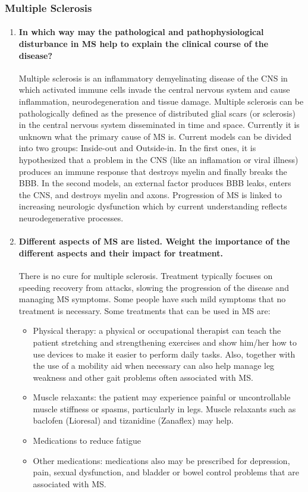 \documentclass[12pt,article,oneside,a4paper]{memoir}
\begin{document}
\subsubsection{Multiple Sclerosis}
\begin{enumerate}
\item \paragraph{In which way may the pathological and pathophysiological disturbance in MS help to explain the clinical course of the disease?}

Multiple sclerosis is an inflammatory demyelinating disease of the CNS in which activated immune cells invade the central nervous system and cause inflammation, neurodegeneration and tissue damage. Multiple sclerosis can be pathologically defined as the presence of distributed glial scars (or sclerosis) in the central nervous system disseminated in time and space. Currently it is unknown what the primary cause of MS is. Current models can be divided into two groups: Inside-out and Outside-in. In the first ones, it is hypothesized that a problem in the CNS (like an inflamation or viral illness) produces an immune response that destroys myelin and finally breaks the BBB. In the second models, an external factor produces BBB leaks, enters the CNS, and destroys myelin and axons. Progression of MS is linked to increasing neurologic dysfunction which by current understanding reflects neurodegenerative processes. 

\item \paragraph{Different aspects of MS are listed. Weight the importance of the different aspects and their impact for treatment.}\label{question:MS-aspects}

There is no cure for multiple sclerosis. Treatment typically focuses on speeding recovery from attacks, slowing the progression of the disease and managing MS symptoms. Some people have such mild symptoms that no treatment is necessary.
Some treatments that can be used in MS are:
\begin{itemize}
\item Physical therapy: a physical or occupational therapist can teach the patient stretching and strengthening exercises and show him/her how to use devices to make it easier to perform daily tasks. Also, together with the use of a mobility aid when necessary can also help manage leg weakness and other gait problems often associated with MS.
\item Muscle relaxants: the patient may experience painful or uncontrollable muscle stiffness or spasms, particularly in legs. Muscle relaxants such as baclofen (Lioresal) and tizanidine (Zanaflex) may help.
\item Medications to reduce fatigue
\item Other medications: medications also may be prescribed for depression, pain, sexual dysfunction, and bladder or bowel control problems that are associated with MS.
\end{itemize}


\end{enumerate}
\end{document}

